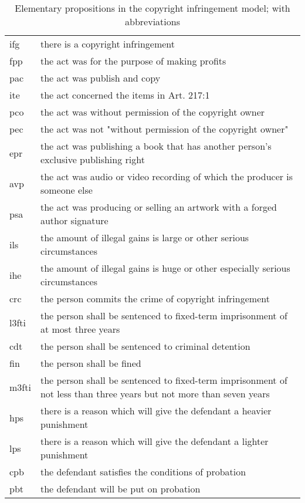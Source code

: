 \documentclass{IOS-Book-Article}
\begin{document}
\begin{table}[t]
	\caption{Elementary propositions in the copyright infringement model; with abbreviations}
	\label{tab:long}

	\begin{tabularx}{\textwidth}{p{0.5cm}|p{11cm}}
		\hline
		ifg & there is a copyright infringement\\
		fpp & the act was for the purpose of making profits\\
		pac & the act was publish and copy\\
		ite & the act concerned the items in Art. 217:1\\
		pco & the act was without permission of the copyright owner\\
		pec & the act was not "without permission of the copyright owner"\\
		epr & the act was publishing a book that has another person's exclusive publishing right\\
		avp & the act was audio or video recording of which the producer is someone else\\
		psa & the act was producing or selling an artwork with a forged author signature\\
		ils & the amount of illegal gains is large or other serious circumstances\\
		ihe & the amount of illegal gains is huge or other especially serious circumstances\\
		crc & the person commits the crime of copyright infringement\\
		l3fti & the person shall be sentenced to fixed-term imprisonment of at most three years\\
		cdt & the person shall be sentenced to criminal detention\\
		fin & the person shall be fined\\
		m3fti & the person shall be sentenced to fixed-term imprisonment of not less than three years but not more than seven years\\
		hps & there is a reason which will give the defendant a heavier punishment\\
		lps & there is a reason which will give the defendant a lighter punishment\\
		cpb & the defendant satisfies the conditions of probation\\
		pbt & the defendant will be put on probation\\
		\hline
	\end{tabularx}

\end{table}
\end{document}
